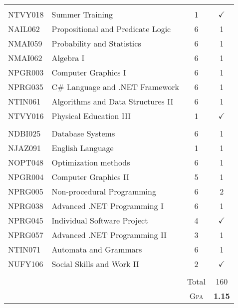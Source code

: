 \documentclass[a4paper,10pt]{article}
\begin{document}
\begin{center}
\begin{supertabular}{l l c c}
\hline\\

NTVY018 & Summer Training & 1 & $\checkmark$\\
NAIL062 & Propositional and Predicate Logic & 6 & 1\\
NMAI059 & Probability and Statistics & 6 & 1\\
NMAI062 & Algebra I & 6 & 1\\
NPGR003 & Computer Graphics I & 6 & 1\\
NPRG035 & C\# Language and .NET Framework & 6 & 1\\
NTIN061 & Algorithms and Data Structures II & 6 & 1\\
NTVY016 & Physical Education III & 1 & $\checkmark$\\

\hline\\

NDBI025 & Database Systems & 6 & 1\\
NJAZ091 & English Language & 1 & 1\\
NOPT048 & Optimization methods & 6 & 1\\
NPGR004 & Computer Graphics II & 5 & 1\\
NPRG005 & Non-procedural Programming & 6 & 2\\
NPRG038 & Advanced .NET Programming I & 6 & 1\\
NPRG045 & Individual Software Project & 4 & $\checkmark$\\
NPRG057 & Advanced .NET Programming II & 3 & 1\\
NTIN071 & Automata and Grammars & 6 & 1\\
NUFY106 & Social Skills and Work II & 2 & $\checkmark$\\


 
\\
& & Total & 160\\
& &\textsc{Gpa} & \textbf{1.15}\\
\end{supertabular}
\end{center}
\end{document}
